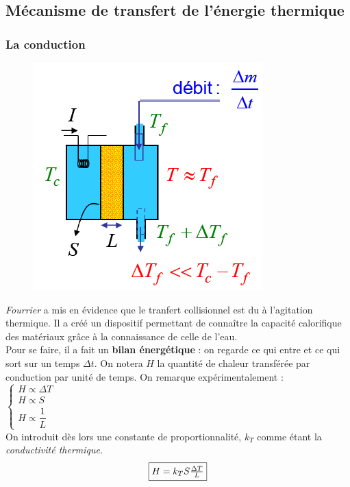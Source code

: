 \documentclass	[11pt, a4paper, openany]{book}
\begin{document}
\subsection{Mécanisme de transfert de l'énergie thermique}
\subsubsection{La conduction}
\begin{figure}
\includegraphics[scale=0.4]{th/image8.png}
\end{figure}
\textit{Fourrier} a mis en évidence que le tranfert collisionnel est du à l'agitation thermique. Il a créé un dispositif permettant de connaître la capacité calorifique des matériaux grâce à la connaissance de celle de l'eau.\\

Pour se faire, il a fait un \textbf{bilan énergétique} : on regarde ce qui entre et ce qui sort sur un temps $\Delta t$. On notera $H$ la quantité de chaleur transférée par conduction par unité de temps. On remarque expérimentalement :\\
$\left\{\begin{array}{l}
H \propto \Delta T\\
H \propto S\\
H \propto \dfrac{1}{L}
\end{array}\right.$\\
On introduit dès lors une constante de proportionnalité, $k_T$ comme étant la \textit{conductivité thermique}.
\begin{equation}
\fbox{$ H = k_TS\frac{\Delta T}{L}$}
\end{equation}
\end{document}
